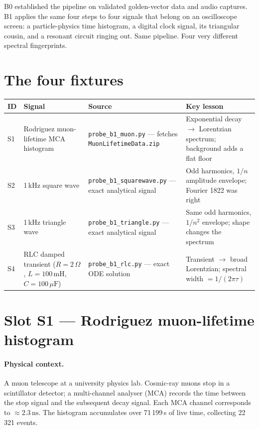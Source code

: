 \documentclass[11pt,a4paper,openany]{book}
\begin{document}
B0 established the pipeline on validated golden-vector data and audio
captures. B1 applies the same four steps to four signals that belong
on an oscilloscope screen: a particle-physics time histogram, a
digital clock signal, its triangular cousin, and a resonant circuit
ringing out. Same pipeline. Four very different spectral fingerprints.

\section{The four fixtures}

\begin{longtable}{p{1.0cm}p{3.5cm}p{3.5cm}p{5.5cm}}
\toprule
\textbf{ID} & \textbf{Signal} & \textbf{Source} & \textbf{Key lesson} \\
\midrule
\endhead
S1 & Rodriguez muon-lifetime MCA histogram & \texttt{probe\_b1\_muon.py} --- fetches \texttt{MuonLifetimeData.zip} & Exponential decay $\to$ Lorentzian spectrum; background adds a flat floor \\
S2 & 1\,kHz square wave & \texttt{probe\_b1\_squarewave.py} --- exact analytical signal & Odd harmonics, $1/n$ amplitude envelope; Fourier 1822 was right \\
S3 & 1\,kHz triangle wave & \texttt{probe\_b1\_triangle.py} --- exact analytical signal & Same odd harmonics, $1/n^2$ envelope; shape changes the spectrum \\
S4 & RLC damped transient ($R=2\,\Omega$, $L=100\,\mathrm{mH}$, $C=100\,\mu\mathrm{F}$) & \texttt{probe\_b1\_rlc.py} --- exact ODE solution & Transient $\to$ broad Lorentzian; spectral width $= 1/(2\pi\tau)$ \\
\bottomrule
\end{longtable}

\clearpage
\section{Slot S1 --- Rodriguez muon-lifetime histogram}
\label{sec:b1s1}

\paragraph{Physical context.}
A muon telescope at a university physics lab. Cosmic-ray muons stop
in a scintillator detector; a multi-channel analyser (MCA) records the
time between the stop signal and the subsequent decay signal. Each MCA
channel corresponds to $\approx\!2.3\,\mathrm{ns}$. The histogram
accumulates over 71\,199\,s of live time, collecting 22\,321 events.
\end{document}
